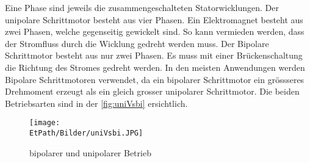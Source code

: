     Eine Phase sind jeweils die zusammengeschalteten Statorwicklungen. Der 
    unipolare Schrittmotor besteht aus vier Phasen. Ein Elektromagnet besteht 
    aus zwei Phasen, welche gegenseitig gewickelt sind. So kann vermieden 
    werden, dass der Stromfluss durch die Wicklung gedreht werden muss. Der 
    Bipolare Schrittmotor besteht aus nur zwei Phasen. Es muss mit einer 
    Brückenschaltung die Richtung des Stromes gedreht werden. In den meisten 
    Anwendungen werden Bipolare Schrittmotoren verwendet, da ein bipolarer 
    Schrittmotor ein grössseres Drehmoment erzeugt als ein gleich grosser 
    unipolarer Schrittmotor. Die beiden Betriebsarten sind in der 
    \autoref{fig:uniVsbi} ersichtlich. 
    \begin{figure}[H]
       	\centering
       	\texttt{[image: \\EtPath/Bilder/uniVsbi.JPG]}
       	\caption{bipolarer und unipolarer Betrieb}
       	\label{fig:uniVsbi}
    \end{figure}
    
       
    

